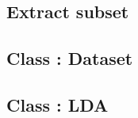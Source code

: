 \documentclass[15pt,landscape,twopage]{article}
\begin{document}
\subsection{Extract subset} \label{extract}


\subsection{Class : Dataset} \label{class:dataset}


\subsection{Class : LDA} \label{class:lda}

\end{document}
